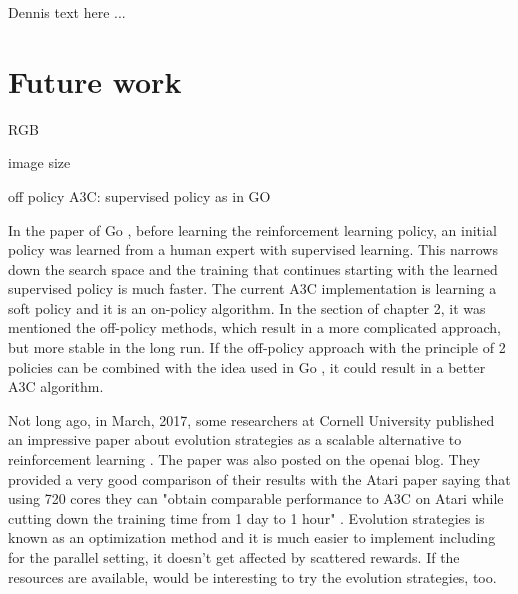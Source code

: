 Dennis text here ...

\section{Future work}
RGB

image size

off policy A3C: supervised policy as in GO

In the paper of Go \cite{Silver_2016}, before learning the reinforcement learning policy, an initial policy was learned from a human expert with supervised learning. This narrows down the search space and the training that continues starting with the learned supervised policy is much faster. The current A3C implementation is learning a soft policy and it is an on-policy algorithm. In the  section of chapter 2, it was mentioned the off-policy methods, which result in a more complicated approach, but more stable in the long run. If the off-policy approach with the principle of 2 policies can be combined with the idea used in Go \cite{Silver_2016}, it could result in a better A3C algorithm.

Not long ago, in March, 2017, some researchers at Cornell University published an impressive paper about evolution strategies as a scalable alternative to reinforcement learning \cite{EvolStrat}. The paper was also posted on the openai blog. They provided a very good comparison of their results with the Atari paper \cite{DBLP:journals/corr/MnihKSGAWR13} saying that using 720 cores they can "obtain comparable performance to A3C on Atari while cutting down the training time from 1 day to 1 hour" \cite{EvolStrat}. Evolution strategies is known as an optimization method and it is much easier to implement including for the parallel setting, it doesn't get affected by scattered rewards. If the resources are available, would be interesting to try the evolution strategies, too.